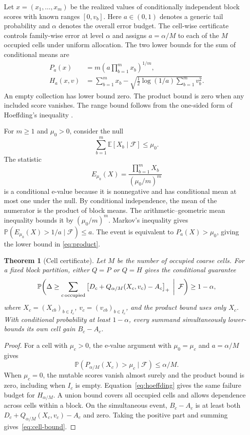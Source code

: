 \documentclass[preprint,11pt]{elsarticle}
\newtheorem{theorem}{Theorem}
\newcommand{\E}{\mathbb E}
\newcommand{\Prb}{\mathbb P}
\newcommand{\given}{\mathcal F}
\newcommand{\pos}[1]{\left[#1\right]_+}
\begin{document}
Let $x=(x_1,\dots,x_m)$ be the realized values of conditionally independent block scores with known ranges $[0,v_b]$. Here $a\in(0,1)$ denotes a generic tail probability and $\alpha$ denotes the overall error budget. The cell-wise certificate controls family-wise error at level $\alpha$ and assigns $a=\alpha/M$ to each of the $M$ occupied cells under uniform allocation. The two lower bounds for the sum of conditional means are
\begin{align}
 P_a(x) &= m\left(a\prod_{b=1}^m x_b\right)^{1/m},\label{eq:product}\\
 H_a(x,v) &= \sum_{b=1}^m x_b-\sqrt{\tfrac12\log(1/a)\sum_{b=1}^m v_b^2}.\label{eq:hoeffding}
\end{align}
An empty collection has lower bound zero. The product bound is zero when any included score vanishes. The range bound follows from the one-sided form of Hoeffding's inequality \cite{hoeffding1963}.

For $m\ge1$ and $\mu_0>0$, consider the null
\[
 \sum_{b=1}^m \E[X_b\mid\given]\le\mu_0.
\]
The statistic
\begin{equation}
 E_{\mu_0}(X)=\frac{\prod\nolimits_{b=1}^m X_b}{(\mu_0/m)^m}
\end{equation}
is a conditional e-value because it is nonnegative and has conditional mean at most one under the null. By conditional independence, the mean of the numerator is the product of block means. The arithmetic--geometric mean inequality bounds it by $(\mu_0/m)^m$. Markov's inequality gives $\Prb(E_{\mu_0}(X)>1/a\mid\given)\le a$. The event is equivalent to $P_a(X)>\mu_0$, giving the lower bound in \eqref{eq:product}.

\begin{theorem}[Cell certificate]
Let $M$ be the number of occupied coarse cells. For a fixed block partition, either $Q=P$ or $Q=H$ gives the conditional guarantee
\begin{equation}
 \Prb\biggl(
 \Delta\ge \sum_{c\,\mathrm{occupied}}
 \pos{D_c+Q_{\alpha/M}(X_c,v_c)-A_c}
 \,\biggm|\,\given
 \biggr)\ge 1-\alpha,
 \label{eq:cell-bound}
\end{equation}
where $X_c=(X_{cb})_{b\in I_c}$, $v_c=(v_{cb})_{b\in I_c}$, and the product bound uses only $X_c$. With conditional probability at least $1-\alpha$, every summand simultaneously lower-bounds its own cell gain $B_c-A_c$.
\end{theorem}

\begin{proof}
For a cell with $\mu_c>0$, the e-value argument with $\mu_0=\mu_c$ and $a=\alpha/M$ gives
\[
 \Prb(P_{\alpha/M}(X_c)>\mu_c\mid\given)\le\alpha/M.
\]
When $\mu_c=0$, the mutable scores vanish almost surely and the product bound is zero, including when $I_c$ is empty. Equation~\eqref{eq:hoeffding} gives the same failure budget for $H_{\alpha/M}$. A union bound covers all occupied cells and allows dependence across cells within a block. On the simultaneous event, $B_c-A_c$ is at least both $D_c+Q_{\alpha/M}(X_c,v_c)-A_c$ and zero. Taking the positive part and summing gives~\eqref{eq:cell-bound}.
\end{proof}
\end{document}
